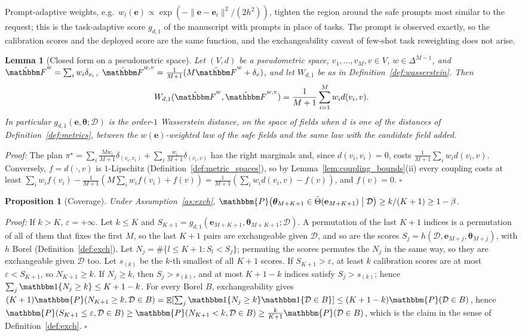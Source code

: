 \documentclass{article}
\DeclareMathOperator{\E}{\mathbb{E}}
\newcommand{\PP}{\mathbbm{P}}
\newcommand{\cD}{\mathcal{D}}
\newcommand{\bth}{\boldsymbol{\theta}}
\newcommand{\be}{\mathbf{e}}
\newcommand{\Tbar}{\bar{\Theta}}
\theoremstyle{plain}
\newtheorem{lemma}[theorem]{Lemma}
\newtheorem{proposition}[theorem]{Proposition}
\theoremstyle{remark}
\begin{document}
Prompt-adaptive weights, e.g.\ $w_i(\be)\propto\exp(-\|\be-\be_i\|^2/(2h^2))$, tighten the region around
the safe prompts most similar to the request; this is the task-adaptive score $g_{d,1}$ of the
manuscript with prompts in place of tasks. The prompt is observed exactly, so the calibration
scores and the deployed score are the same function, and the exchangeability caveat of
few-shot task reweighting does not arise.

\begin{lemma}[Closed form on a pseudometric space]\label{lem:closed_form}
Let $(V,d)$ be a pseudometric space, $v_1,\dots,v_M,v\in V$, $w\in\Delta^{M-1}$, and
$\hat{\mathbbm F}^w=\sum_iw_i\delta_{v_i}$, $\hat{\mathbbm F}^{w,v}=\frac{1}{M+1}(M\hat{\mathbbm F}^w+\delta_v)$, and let $W_{d,1}$ be as in
Definition~\ref{def:wasserstein}. Then
\[
W_{d,1}(\hat{\mathbbm F}^w,\hat{\mathbbm F}^{w,v})=\frac{1}{M+1}\sum_{i=1}^Mw_id(v_i,v).
\]
In particular $g_{d,1}(\be,\bth;\cD)$ is the order-$1$ Wasserstein distance, on the space of fields
when $d$ is one of the distances of Definition~\ref{def:metrics}, between the $w(\be)$-weighted law of
the safe fields and the same law with the candidate field added.
\end{lemma}
\textit{Proof:}
The plan $\pi^\star=\sum_i\frac{Mw_i}{M+1}\delta_{(v_i,v_i)}+\sum_i\frac{w_i}{M+1}\delta_{(v_i,v)}$ has the right marginals
and, since $d(v_i,v_i)=0$, costs $\frac{1}{M+1}\sum_iw_id(v_i,v)$. Conversely, $f=d(\cdot,v)$ is $1$-Lipschitz
(Definition~\ref{def:metric_spaces}), so by Lemma~\ref{lem:coupling_bounds}(ii) every coupling costs at least
$\sum_iw_if(v_i)-\frac{1}{M+1}(M\sum_iw_if(v_i)+f(v))=\frac{1}{M+1}(\sum_iw_id(v_i,v)-f(v))$, and $f(v)=0$. \hfill$\square$

\begin{proposition}[Coverage]\label{pr:coverage}
Under Assumption~\ref{as:exch},
$\PP\big(\bth_{M+K+1}\in\Tbar(\be_{M+K+1})\mathrel{\big|}\cD\big)\ge k/(K+1)\ge1-\beta$.
\end{proposition}
\textit{Proof:}
If $k>K$, $\varepsilon=+\infty$. Let $k\le K$ and $S_{K+1}=g_{d,1}(\be_{M+K+1},\bth_{M+K+1};\cD)$. A permutation of the last $K+1$ indices is a
permutation of all of them that fixes the first $M$, so the last $K+1$ pairs are exchangeable given $\cD$, and so are the scores
$S_j=h(\cD,\be_{M+j},\bth_{M+j})$, with $h$ Borel (Definition~\ref{def:exch}). Let $N_j=\#\{l\le K+1:S_l<S_j\}$; permuting the scores permutes
the $N_j$ in the same way, so they are exchangeable given $\cD$ too. Let $s_{(k)}$ be the $k$-th smallest of all $K+1$ scores. If
$S_{K+1}>\varepsilon$, at least $k$ calibration scores are at most $\varepsilon<S_{K+1}$, so $N_{K+1}\ge k$. If $N_j\ge k$, then $S_j>s_{(k)}$, and at
most $K+1-k$ indices satisfy $S_j>s_{(k)}$; hence $\sum_j\mathbbm 1\{N_j\ge k\}\le K+1-k$. For every Borel $B$, exchangeability gives
$(K+1)\PP(N_{K+1}\ge k,\cD\in B)=\E[\sum_j\mathbbm 1\{N_j\ge k\}\mathbbm 1\{\cD\in B\}]\le(K+1-k)\PP(\cD\in B)$, hence
$\PP(S_{K+1}\le\varepsilon,\cD\in B)\ge\PP(N_{K+1}<k,\cD\in B)\ge\frac{k}{K+1}\PP(\cD\in B)$, which is the claim in the sense of
Definition~\ref{def:exch}. \hfill$\square$
\end{document}
